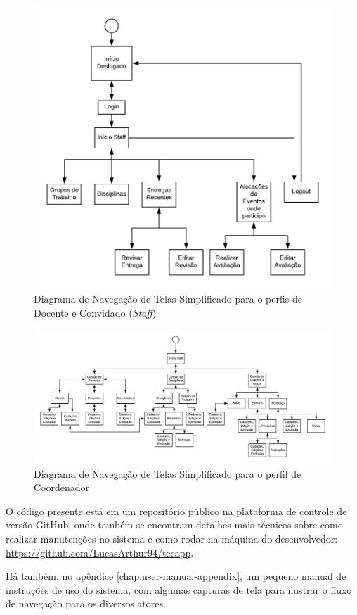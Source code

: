 \begin{figure}[!htpb]
    \centering
    \includegraphics[scale=1.1]{imagens/telas_staff.png}
    \caption{Diagrama de Navegação de Telas Simplificado para o perfis de Docente e Convidado (\textit{Staff})}
    \label{fig:telas-staff}
\end{figure}

\begin{figure}[!htpb]
    \centering
    \includegraphics[angle=90, origin=c,scale=0.8]{imagens/telas_coordenador.png}
    \caption{Diagrama de Navegação de Telas Simplificado para o perfil de Coordenador}
    \label{fig:telas-coordenador}
\end{figure}

O código presente está em um repositório público na plataforma de controle de versão GitHub, onde também se encontram detalhes mais técnicos sobre como realizar manutenções no sistema e como rodar na máquina do desenvolvedor: \href{https://github.com/LucasArthur94/tccapp}{https://github.com/LucasArthur94/tccapp}.

Há também, no apêndice \ref{chap:user-manual-appendix}, um pequeno manual de instruções de uso do sistema, com algumas capturas de tela para ilustrar o fluxo de navegação para os diversos atores.